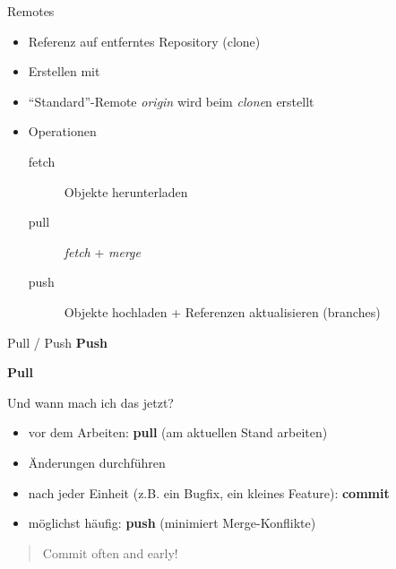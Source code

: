 \begin{frame}{Remotes}
    \begin{itemize}
        \item Referenz auf entferntes Repository (clone)
        \item Erstellen mit
        \item ``Standard''-Remote \emph{origin} wird beim \emph{clone}n erstellt
        \item Operationen
            \begin{description}
                \item[fetch] Objekte herunterladen
                \item[pull] \emph{fetch} + \emph{merge}
                \item[push] Objekte hochladen + Referenzen aktualisieren (branches)
            \end{description}
    \end{itemize}
\end{frame}

\begin{frame}{Pull / Push}
    \textbf{Push}\\[0.5em]


    \vspace{1em}

    \textbf{Pull}\\[0.5em]

\end{frame}

\begin{frame}{Und wann mach ich das jetzt?}
    \pause

    \begin{itemize}
        \item vor dem Arbeiten: \textbf{pull} (am aktuellen Stand arbeiten)
        \item Änderungen durchführen
        \item nach jeder Einheit (z.B. ein Bugfix, ein kleines Feature): \textbf{commit}
        \item möglichst häufig: \textbf{push} (minimiert Merge-Konflikte)
    \end{itemize}

    \pause

    \vspace{1cm}

    \begin{quote}
        Commit often and early!
    \end{quote}
\end{frame}

